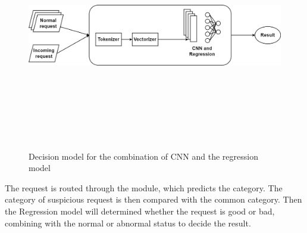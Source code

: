 \begin{figure}[!h]
     \centering
     \includegraphics[width=\linewidth, height=10cm,keepaspectratio]{figures/decision model.png}
   \caption{Decision model for the combination of CNN and the regression model}
\end{figure}

The request is routed through the module, which predicts the category. The category of suspicious request is then compared with the common category. Then the Regression model will determined whether the request is good or bad, combining with the normal or abnormal status to decide the result. 

